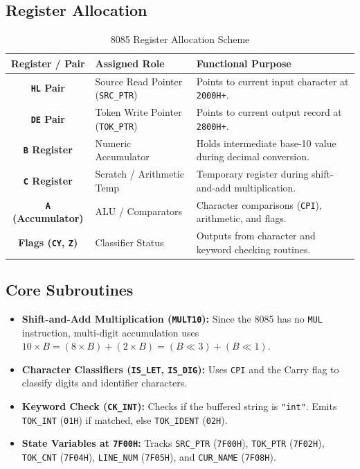 \documentclass[11pt,a4paper]{article}
\begin{document}
\subsection*{Register Allocation}
\begin{table}[H]
\centering
\small
\caption{8085 Register Allocation Scheme}
\label{tab:registers}
\begin{tabularx}{\textwidth}{|c|l|X|}
\hline
\rowcolor[gray]{0.92}
\textbf{Register / Pair} & \textbf{Assigned Role} & \textbf{Functional Purpose} \\
\hline
\textbf{\texttt{HL} Pair} & Source Read Pointer (\texttt{SRC\_PTR}) & Points to current input character at \texttt{2000H+}. \\
\hline
\textbf{\texttt{DE} Pair} & Token Write Pointer (\texttt{TOK\_PTR}) & Points to current output record at \texttt{2800H+}. \\
\hline
\textbf{\texttt{B} Register} & Numeric Accumulator & Holds intermediate base-10 value during decimal conversion. \\
\hline
\textbf{\texttt{C} Register} & Scratch / Arithmetic Temp & Temporary register during shift-and-add multiplication. \\
\hline
\textbf{\texttt{A} (Accumulator)} & ALU / Comparators & Character comparisons (\texttt{CPI}), arithmetic, and flags. \\
\hline
\textbf{Flags (\texttt{CY}, \texttt{Z})} & Classifier Status & Outputs from character and keyword checking routines. \\
\hline
\end{tabularx}
\end{table}

\subsection*{Core Subroutines}
\begin{itemize}[itemsep=2pt, topsep=2pt]
    \item \textbf{Shift-and-Add Multiplication (\texttt{MULT10}):} Since the 8085 has no \texttt{MUL} instruction, multi-digit accumulation uses $10 \times B = (8 \times B) + (2 \times B) = (B \ll 3) + (B \ll 1)$.
    \item \textbf{Character Classifiers (\texttt{IS\_LET}, \texttt{IS\_DIG}):} Uses \texttt{CPI} and the Carry flag to classify digits and identifier characters.
    \item \textbf{Keyword Check (\texttt{CK\_INT}):} Checks if the buffered string is \texttt{"int"}. Emits \texttt{TOK\_INT} (\texttt{01H}) if matched, else \texttt{TOK\_IDENT} (\texttt{02H}).
    \item \textbf{State Variables at \texttt{7F00H}:} Tracks \texttt{SRC\_PTR} (\texttt{7F00H}), \texttt{TOK\_PTR} (\texttt{7F02H}), \texttt{TOK\_CNT} (\texttt{7F04H}), \texttt{LINE\_NUM} (\texttt{7F05H}), and \texttt{CUR\_NAME} (\texttt{7F08H}).
\end{itemize}
\end{document}
